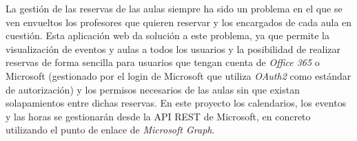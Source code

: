 
La gestión de las reservas de las aulas siempre ha sido un problema en el que se ven envueltos los profesores que quieren reservar y los encargados de cada aula en cuestión.
Esta aplicación web da solución a este problema, ya que permite la visualización de eventos y aulas a todos los usuarios y la posibilidad de realizar reservas de forma sencilla para usuarios que tengan cuenta de \textit{Office 365} o Microsoft (gestionado por el login de Microsoft que utiliza \textit{OAuth2} como estándar de autorización) y los permisos necesarios de las aulas sin que existan solapamientos entre dichas reservas. En este proyecto los calendarios, los eventos y las horas se gestionarán desde la API REST de Microsoft, en concreto utilizando el punto de enlace de \textit{Microsoft Graph}.